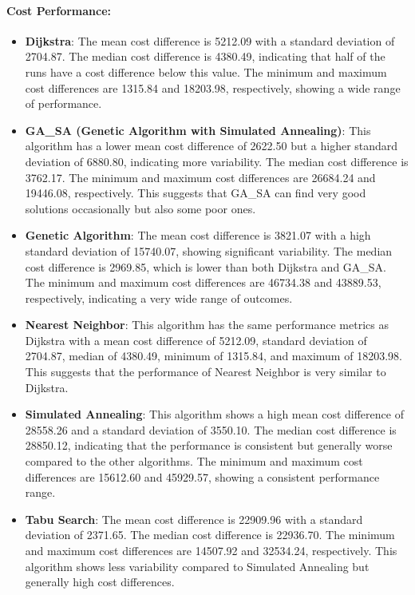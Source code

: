 \documentclass[
]{article}
\begin{document}
    \paragraph{Cost Performance:}
    \begin{itemize}
        \item \textbf{Dijkstra}: The mean cost difference is 5212.09 with a standard deviation of 2704.87. The median cost difference is 4380.49, indicating that half of the runs have a cost difference below this value. The minimum and maximum cost differences are 1315.84 and 18203.98, respectively, showing a wide range of performance.
        \item \textbf{GA\_SA (Genetic Algorithm with Simulated Annealing)}: This algorithm has a lower mean cost difference of 2622.50 but a higher standard deviation of 6880.80, indicating more variability. The median cost difference is 3762.17. The minimum and maximum cost differences are 26684.24 and 19446.08, respectively. This suggests that GA\_SA can find very good solutions occasionally but also some poor ones.
        \item \textbf{Genetic Algorithm}: The mean cost difference is 3821.07 with a high standard deviation of 15740.07, showing significant variability. The median cost difference is 2969.85, which is lower than both Dijkstra and GA\_SA. The minimum and maximum cost differences are 46734.38 and 43889.53, respectively, indicating a very wide range of outcomes.
        \item \textbf{Nearest Neighbor}: This algorithm has the same performance metrics as Dijkstra with a mean cost difference of 5212.09, standard deviation of 2704.87, median of 4380.49, minimum of 1315.84, and maximum of 18203.98. This suggests that the performance of Nearest Neighbor is very similar to Dijkstra.
        \item \textbf{Simulated Annealing}: This algorithm shows a high mean cost difference of 28558.26 and a standard deviation of 3550.10. The median cost difference is 28850.12, indicating that the performance is consistent but generally worse compared to the other algorithms. The minimum and maximum cost differences are 15612.60 and 45929.57, showing a consistent performance range.
        \item \textbf{Tabu Search}: The mean cost difference is 22909.96 with a standard deviation of 2371.65. The median cost difference is 22936.70. The minimum and maximum cost differences are 14507.92 and 32534.24, respectively. This algorithm shows less variability compared to Simulated Annealing but generally high cost differences.
    \end{itemize}
\end{document}
